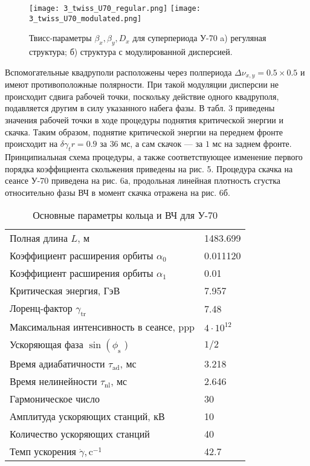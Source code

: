 \begin{figure} [h!]
   \texttt{[image: 3\_twiss\_U70\_regular.png]}
   \texttt{[image: 3\_twiss\_U70\_modulated.png]}
   \caption{Твисс-параметры $\beta_x,\beta_y, D_x$ для суперпериода У-70 a) регуляная структура; б) структура с модулированной дисперсией.}
   \label{fig:3_twiss_U70}
\end{figure}

\par Вспомогательные квадруполи расположены через полпериода $\Delta\nu_{x,y}=0.5\times0.5$ и имеют противоположные полярности. При такой модуляции дисперсии не происходит сдвига рабочей точки, поскольку действие одного квадруполя, подавляется другим в силу указанного набега фазы. В табл. 3 приведены значения рабочей точки в ходе процедуры поднятия критической энергии и скачка. Таким образом, поднятие критической энергии на переднем фронте происходит на $\delta \gamma_tr=0.9$ за $36$ мс, а сам скачок — за $1$ мс на заднем фронте. Принципиальная схема процедуры, а также соответствующее изменение первого порядка коэффициента скольжения приведены на рис. 5. Процедура скачка на сеансе У-70 приведена на рис. 6а, продольная линейная плотность сгустка относительно фазы ВЧ в момент скачка отражена на рис. 6б.

\begin{table}
\begin{center}
\begin{tabular}{| m{10cm} | M{2.5cm} |}
\hline Полная длина $L$, м  & 1483.699 \\
Коэффициент расширения орбиты $\alpha_0$ & 0.011120 \\
Коэффициент расширения орбиты $\alpha_1$ & 0.01 \\
Критическая энергия, ГэВ & 7.957 \\
Лоренц-фактор $\gamma_{\mathrm{tr}}$ & 7.48 \\
Максимальная интенсивность в сеансе, ppp & $4 \cdot 10^{12}$ \\
Ускоряющая фаза $\sin \left(\phi_{\mathrm{s}}\right.$ ) & $1 / 2$ \\
Время адиабатичности $\tau_{\mathrm{ad}}$, мс & 3.218 \\
Время нелинейности $\tau_{\mathrm{nl}}$, мс & 2.646 \\
Гармоническое число & 30 \\
Амплитуда ускоряющих станций, кВ & 10 \\
Количество ускоряющих станций & 40 \\
Темп ускорения $\dot{\gamma}, \mathrm{c}^{-1}$ & 42.7 \\
\hline
\end{tabular}
\end{center}
\caption{Основные параметры кольца и ВЧ для У-70}
\end{table}


